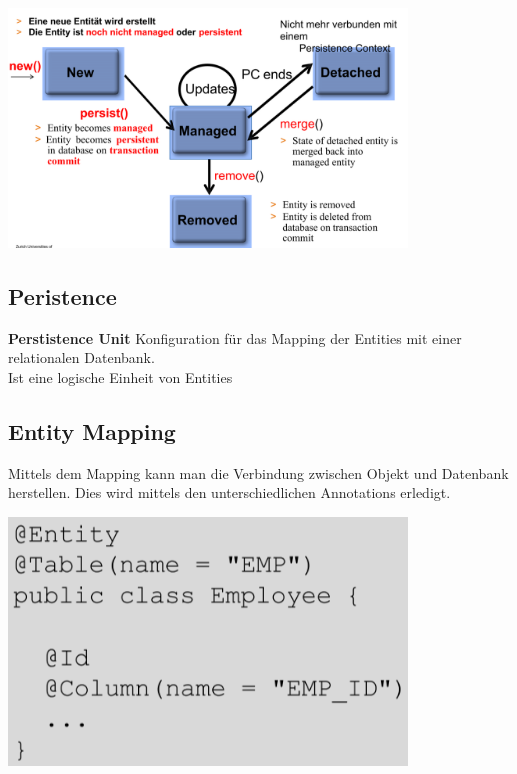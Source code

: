 \documentclass{report}
\newenvironment{Figure}
	{\par\medskip\noindent\minipage{\linewidth}}
	{\endminipage\par\medskip}
\theoremstyle{definition}
\theoremstyle{example}
\begin{document}
\begin{Figure}
\centering
\includegraphics[width=400px]{img/EntityLifecycle.png}
	\label{fig:Entity Lifecycle}
\end{Figure}


\subsection{Peristence}
\textbf{Perstistence Unit} Konfiguration für das Mapping der Entities mit einer relationalen Datenbank.\\
Ist eine logische Einheit von Entities

\subsection{Entity Mapping}
Mittels dem Mapping kann man die Verbindung zwischen Objekt und Datenbank herstellen. Dies wird mittels den unterschiedlichen Annotations erledigt.

\begin{Figure}
\centering
\includegraphics[width=400px]{img/MappingBsp.png}
	\label{fig:Beispiel Mapping}
\end{Figure}
\end{document}
